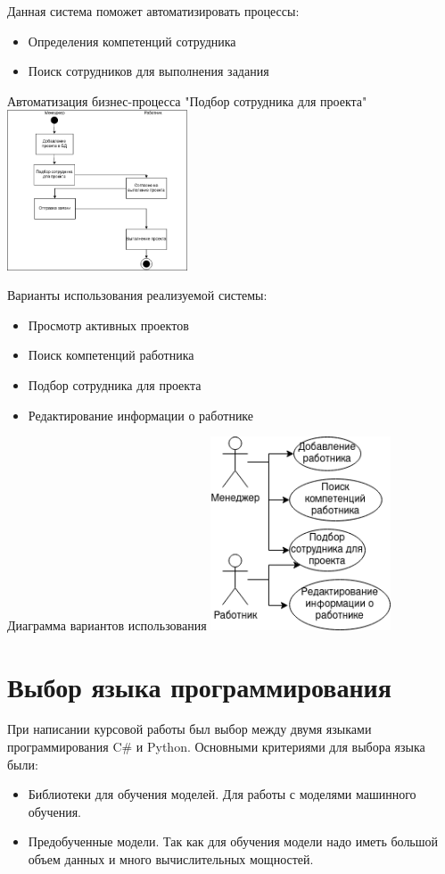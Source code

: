 \documentclass[PI,KR]{HSEUniversity}
\begin{document}
Данная система поможет автоматизировать процессы:
\begin{itemize}
	\item Определения компетенций сотрудника
	\item Поиск сотрудников для выполнения задания
\end{itemize}
\begin{FIGURE}[h]{Автоматизация бизнес-процесса "Подбор сотрудника для проекта" \label{fig:example-figure-2}}
	\includegraphics[width=0.4\textwidth]{img/Диаграмма Бизнес-процесса}
\end{FIGURE}
Варианты использования реализуемой системы:
\begin{itemize}
	\item Просмотр активных проектов
	\item Поиск компетенций работника
	\item Подбор сотрудника для проекта
	\item Редактирование информации о работнике
\end{itemize}

\begin{FIGURE}[h]{Диаграмма вариантов использования \label{fig:example-figure-2}}
	\includegraphics[width=0.4\textwidth]{img/Диаграмма вариантов использования}
\end{FIGURE}

\section{Выбор языка программирования}
При написании курсовой работы был выбор между двумя языками программирования C\# и Python. Основными критериями для выбора языка были:
\begin{itemize}
	\item Библиотеки для обучения моделей. Для работы с моделями машинного обучения.
	\item Предобученные модели. Так как для обучения модели надо иметь большой объем данных и много вычислительных мощностей.
\end{itemize} 
\end{document}
